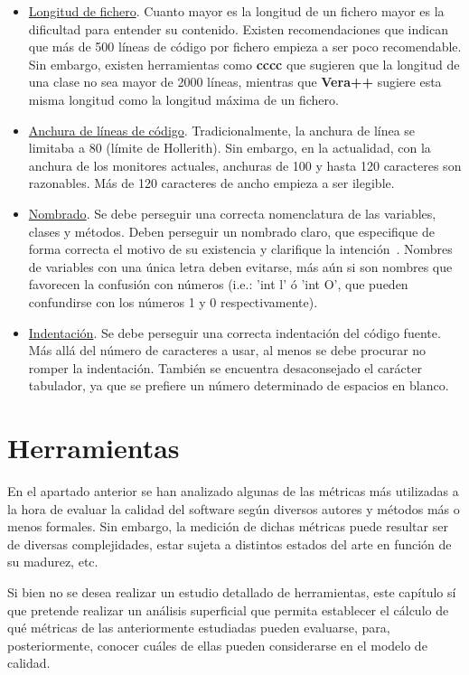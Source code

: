 \documentclass[11pt]{article}
\begin{document}
\begin{itemize}
\item{\underline{Longitud de fichero}}. Cuanto mayor es la longitud de un fichero mayor es la dificultad para entender su contenido\cite{unclebob:cleancode}. Existen recomendaciones que indican que más de 500 líneas de código por fichero empieza a ser poco recomendable. Sin embargo, existen herramientas como \textbf{cccc} que sugieren que la longitud de una clase no sea mayor de 2000 líneas, mientras que \textbf{Vera++} sugiere esta misma longitud como la longitud máxima de un fichero.
\item{\underline{Anchura de líneas de código}}. Tradicionalmente, la anchura de línea se limitaba a 80 (límite de Hollerith). Sin embargo, en la actualidad, con la anchura de los monitores actuales, anchuras de 100 y hasta 120 caracteres son razonables. Más de 120 caracteres de ancho empieza a ser ilegible.
\item{\underline{Nombrado}}. Se debe perseguir una correcta nomenclatura de las variables, clases y métodos. Deben perseguir un nombrado claro, que especifique de forma correcta el motivo de su existencia y clarifique la intención~\cite{unclebob:cleancode}. Nombres de variables con una única letra deben evitarse, más aún si son nombres que favorecen la confusión con números (i.e.: 'int l' ó 'int O', que pueden confundirse con los números 1 y 0 respectivamente). 
\item{\underline{Indentación}}. Se debe perseguir una correcta indentación del código fuente. Más allá del número de caracteres a usar, al menos se debe procurar no romper la indentación. También se encuentra desaconsejado el carácter tabulador, ya que se prefiere un número determinado de espacios en blanco.
\end{itemize}

\section{Herramientas}

En el apartado anterior se han analizado algunas de las métricas más utilizadas a la hora de evaluar la calidad del software según diversos autores y métodos más o menos formales. Sin embargo, la medición de dichas métricas puede resultar ser de diversas complejidades, estar sujeta a distintos estados del arte en función de su madurez, etc.

Si bien no se desea realizar un estudio detallado de herramientas, este capítulo sí que pretende realizar un análisis superficial que permita establecer el cálculo de qué métricas de las anteriormente estudiadas pueden evaluarse, para, posteriormente, conocer cuáles de ellas pueden considerarse en el modelo de calidad.
\end{document}
